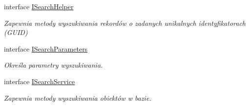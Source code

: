 \begin{DoxyCompactItemize}
interface \hyperlink{interface_contract_1_1_i_search_helper}{I\+Search\+Helper}
\begin{DoxyCompactList}\small\item\em Zapewnia metody wyszukiwania rekordów o zadanych unikalnych identyfikatorach (G\+U\+I\+D) \end{DoxyCompactList}\item 
interface \hyperlink{interface_contract_1_1_i_search_parameters}{I\+Search\+Parameters}
\begin{DoxyCompactList}\small\item\em Określa parametry wyszukiwania. \end{DoxyCompactList}\item 
interface \hyperlink{interface_contract_1_1_i_search_service}{I\+Search\+Service}
\begin{DoxyCompactList}\small\item\em Zapewnia metody wyszukiwania obiektów w bazie. \end{DoxyCompactList}\end{DoxyCompactItemize}
